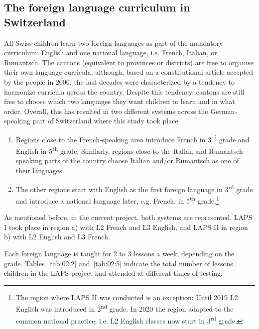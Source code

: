 \documentclass[output=paper]{langsci/langscibook}
\begin{document}
 \subsection{The foreign language curriculum in Switzerland}\label{sec:02:2.1}


All Swiss children learn two foreign languages as part of the mandatory curriculum: English and one national language, i.e. French, Italian, or Rumantsch. The cantons (equivalent to provinces or districts) are free to organise their own language curricula, although, based on a constitutional article accepted by the people in 2006, the last decades were characterized by a tendency to harmonize curricula across the country. Despite this tendency, cantons are still free to choose which two languages they want children to learn and in what order. Overall, this has resulted in two different systems across the German-speaking part of Switzerland where this study took place:

\begin{enumerate}[label=\alph*.]
\item Regions close to the French-speaking area introduce French in 3\textsuperscript{rd} grade and English in 5\textsuperscript{th} grade. Similarly, regions close to the Italian and Rumantsch speaking parts of the country choose Italian and/or Rumantsch as one of their languages.
\item The other regions start with English as the first foreign language in 3\textsuperscript{rd} grade and introduce a national language later, e.g. French, in 5\textsuperscript{th} grade.\footnote{The region where LAPS II was conducted is an exception: Until 2019 L2 English was introduced in 2\textsuperscript{nd} grade. In 2020 the region adapted to the common national practice, i.e. L2 English classes now start in 3\textsuperscript{rd} grade.}
\end{enumerate}

As mentioned before, in the current project, both systems are represented. LAPS I took place in region a) with L2 French and L3 English, and LAPS II in region b) with L2 English and L3 French.

Each foreign language is taught for 2 to 3 lessons a week, depending on the grade. Tables~\ref{tab:02:2} and~\ref{tab:02:5} indicate the total number of lessons children in the LAPS project had attended at different times of testing. 
\end{document}

